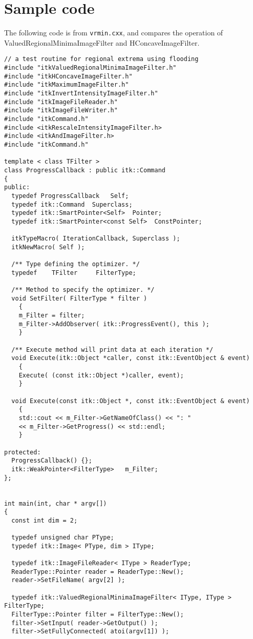 \documentclass{llncs}
\begin{document}
\section{Sample code}
The following code is from {\tt vrmin.cxx}, and compares the operation
of ValuedRegionalMinimaImageFilter and HConcaveImageFilter.

\lstset{language=C,  basicstyle=\small}
\begin{lstlisting}
// a test routine for regional extrema using flooding
#include "itkValuedRegionalMinimaImageFilter.h"
#include "itkHConcaveImageFilter.h"
#include "itkMaximumImageFilter.h"
#include "itkInvertIntensityImageFilter.h"
#include "itkImageFileReader.h"
#include "itkImageFileWriter.h"
#include "itkCommand.h"
#include <itkRescaleIntensityImageFilter.h>
#include <itkAndImageFilter.h>
#include "itkCommand.h"

template < class TFilter >
class ProgressCallback : public itk::Command
{
public:
  typedef ProgressCallback   Self;
  typedef itk::Command  Superclass;
  typedef itk::SmartPointer<Self>  Pointer;
  typedef itk::SmartPointer<const Self>  ConstPointer;

  itkTypeMacro( IterationCallback, Superclass );
  itkNewMacro( Self );

  /** Type defining the optimizer. */
  typedef    TFilter     FilterType;

  /** Method to specify the optimizer. */
  void SetFilter( FilterType * filter )
    {
    m_Filter = filter;
    m_Filter->AddObserver( itk::ProgressEvent(), this );
    }

  /** Execute method will print data at each iteration */
  void Execute(itk::Object *caller, const itk::EventObject & event)
    {
    Execute( (const itk::Object *)caller, event);
    }

  void Execute(const itk::Object *, const itk::EventObject & event)
    {
    std::cout << m_Filter->GetNameOfClass() << ": " 
	<< m_Filter->GetProgress() << std::endl;
    }

protected:
  ProgressCallback() {};
  itk::WeakPointer<FilterType>   m_Filter;
};


int main(int, char * argv[])
{
  const int dim = 2;
  
  typedef unsigned char PType;
  typedef itk::Image< PType, dim > IType;

  typedef itk::ImageFileReader< IType > ReaderType;
  ReaderType::Pointer reader = ReaderType::New();
  reader->SetFileName( argv[2] );

  typedef itk::ValuedRegionalMinimaImageFilter< IType, IType > FilterType;
  FilterType::Pointer filter = FilterType::New();
  filter->SetInput( reader->GetOutput() );
  filter->SetFullyConnected( atoi(argv[1]) );


\end{lstlisting}
\end{document}
